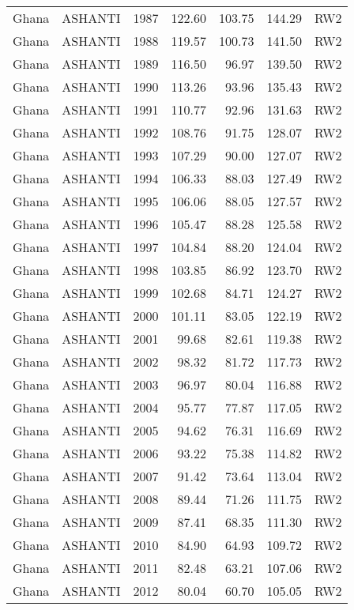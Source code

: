 \begin{longtable}{lllrrrl}
  Ghana & ASHANTI & 1987 & 122.60 & 103.75 & 144.29 & RW2 \\ 
  Ghana & ASHANTI & 1988 & 119.57 & 100.73 & 141.50 & RW2 \\ 
  Ghana & ASHANTI & 1989 & 116.50 & 96.97 & 139.50 & RW2 \\ 
  Ghana & ASHANTI & 1990 & 113.26 & 93.96 & 135.43 & RW2 \\ 
  Ghana & ASHANTI & 1991 & 110.77 & 92.96 & 131.63 & RW2 \\ 
  Ghana & ASHANTI & 1992 & 108.76 & 91.75 & 128.07 & RW2 \\ 
  Ghana & ASHANTI & 1993 & 107.29 & 90.00 & 127.07 & RW2 \\ 
  Ghana & ASHANTI & 1994 & 106.33 & 88.03 & 127.49 & RW2 \\ 
  Ghana & ASHANTI & 1995 & 106.06 & 88.05 & 127.57 & RW2 \\ 
  Ghana & ASHANTI & 1996 & 105.47 & 88.28 & 125.58 & RW2 \\ 
  Ghana & ASHANTI & 1997 & 104.84 & 88.20 & 124.04 & RW2 \\ 
  Ghana & ASHANTI & 1998 & 103.85 & 86.92 & 123.70 & RW2 \\ 
  Ghana & ASHANTI & 1999 & 102.68 & 84.71 & 124.27 & RW2 \\ 
  Ghana & ASHANTI & 2000 & 101.11 & 83.05 & 122.19 & RW2 \\ 
  Ghana & ASHANTI & 2001 & 99.68 & 82.61 & 119.38 & RW2 \\ 
  Ghana & ASHANTI & 2002 & 98.32 & 81.72 & 117.73 & RW2 \\ 
  Ghana & ASHANTI & 2003 & 96.97 & 80.04 & 116.88 & RW2 \\ 
  Ghana & ASHANTI & 2004 & 95.77 & 77.87 & 117.05 & RW2 \\ 
  Ghana & ASHANTI & 2005 & 94.62 & 76.31 & 116.69 & RW2 \\ 
  Ghana & ASHANTI & 2006 & 93.22 & 75.38 & 114.82 & RW2 \\ 
  Ghana & ASHANTI & 2007 & 91.42 & 73.64 & 113.04 & RW2 \\ 
  Ghana & ASHANTI & 2008 & 89.44 & 71.26 & 111.75 & RW2 \\ 
  Ghana & ASHANTI & 2009 & 87.41 & 68.35 & 111.30 & RW2 \\ 
  Ghana & ASHANTI & 2010 & 84.90 & 64.93 & 109.72 & RW2 \\ 
  Ghana & ASHANTI & 2011 & 82.48 & 63.21 & 107.06 & RW2 \\ 
  Ghana & ASHANTI & 2012 & 80.04 & 60.70 & 105.05 & RW2 \\ 

\end{longtable}
